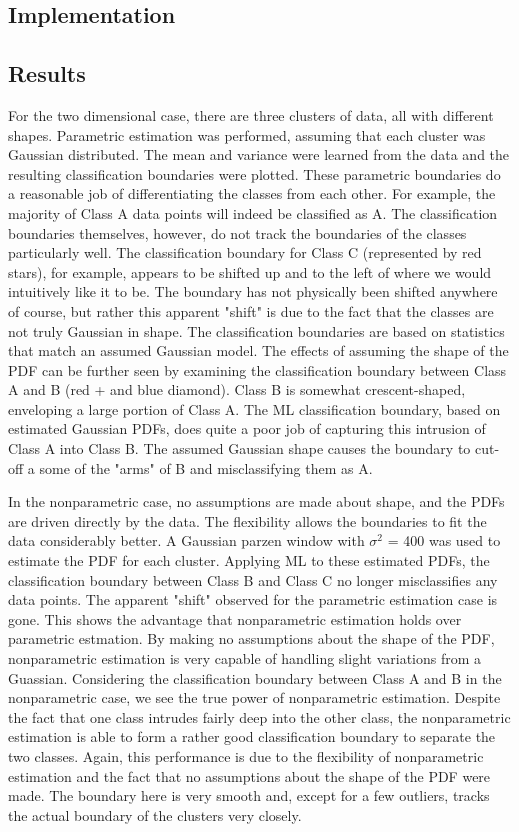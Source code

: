 \label{sec:2d}
\subsection{Implementation}

\subsection{Results}
For the two dimensional case, there are three clusters of data, all with
different shapes. Parametric estimation was performed, assuming that each
cluster was Gaussian distributed.  The mean and variance were learned from the
data and the resulting classification boundaries were plotted.  These
parametric boundaries do a reasonable job of differentiating the classes from
each other.  For example, the majority of Class A data points will indeed be
classified as A.  The classification boundaries themselves, however, do not
track the boundaries of the classes particularly well. The classification
boundary for Class C (represented by red stars), for example, appears to be
shifted up and to the left of where we would intuitively like it to be.  The
boundary has not physically been shifted anywhere of course, but rather this
apparent "shift" is due to the fact that the classes are not truly Gaussian in
shape.  The classification boundaries are based on statistics that match an
assumed Gaussian model.  The effects of assuming the shape of the PDF can be
further seen by examining the classification boundary between Class A and B
(red + and blue diamond).  Class B is somewhat crescent-shaped, enveloping a
large portion of Class A.  The ML classification boundary, based on estimated
Gaussian PDFs, does quite a poor job of capturing this intrusion of Class A
into Class B.  The assumed Gaussian shape causes the boundary to cut-off a
some of the "arms" of B and misclassifying them as A.

In the nonparametric case, no assumptions are made about shape, and the PDFs
are driven directly by the data.  The flexibility allows the boundaries to fit
the data considerably better.  A Gaussian parzen window with $\sigma^2$ = 400
was used to estimate the PDF for each cluster.  Applying ML to these estimated
PDFs, the classification boundary between Class B and Class C no longer
misclassifies any data points.  The apparent "shift" observed for the
parametric estimation case is gone.  This shows the advantage that
nonparametric estimation holds over parametric estmation.  By making no
assumptions about the shape of the PDF, nonparametric estimation is very
capable of handling slight variations from a Guassian.  Considering the
classification boundary between Class A and B in the nonparametric case, we see
the true power of nonparametric estimation.  Despite the fact that one class
intrudes fairly deep into the other class, the nonparametric estimation is able
to form a rather good classification boundary to separate the two classes. 
Again, this performance is due to the flexibility of nonparametric estimation
and the fact that no assumptions about the shape of the PDF were made.  The
boundary here is very smooth and, except for a few outliers, tracks the actual
boundary of the clusters very closely.

